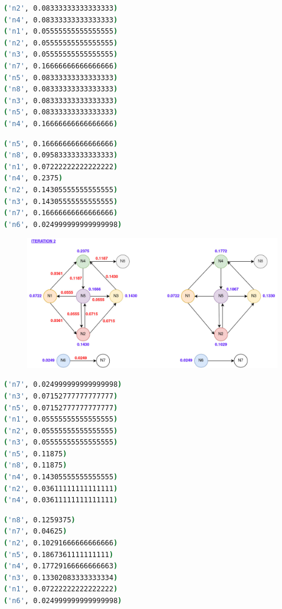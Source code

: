 \documentclass[11pt,a4paper]{article}
\begin{document}
\begin{minipage}{.45\textwidth}
\begin{lstlisting}[language=bash,title={Contributions}]
('n2', 0.08333333333333333)
('n4', 0.08333333333333333)
('n1', 0.05555555555555555)
('n2', 0.05555555555555555)
('n3', 0.05555555555555555)
('n7', 0.16666666666666666)
('n5', 0.08333333333333333)
('n8', 0.08333333333333333)
('n3', 0.08333333333333333)
('n5', 0.08333333333333333)
('n4', 0.16666666666666666)
\end{lstlisting}
\end{minipage}\hfill
\begin{minipage}{.45\textwidth}
\begin{lstlisting}[language=bash,title={New PageRanks}]
('n5', 0.16666666666666666)
('n8', 0.09583333333333333)
('n1', 0.07222222222222222)
('n4', 0.2375)
('n2', 0.14305555555555555)
('n3', 0.14305555555555555)
('n7', 0.16666666666666666)
('n6', 0.024999999999999998)
\end{lstlisting}
\end{minipage}
\begin{figure}[H]
    \centering
    \includegraphics[scale=0.26]{imgs/iteration-2.jpg}
\end{figure}
\begin{minipage}{.45\textwidth}
\begin{lstlisting}[language=bash,title={Contributions}]
('n7', 0.024999999999999998)
('n3', 0.07152777777777777)
('n5', 0.07152777777777777)
('n1', 0.05555555555555555)
('n2', 0.05555555555555555)
('n3', 0.05555555555555555)
('n5', 0.11875)
('n8', 0.11875)
('n4', 0.14305555555555555)
('n2', 0.03611111111111111)
('n4', 0.03611111111111111)
\end{lstlisting}
\end{minipage}\hfill
\begin{minipage}{.45\textwidth}
\begin{lstlisting}[language=bash,title={New PageRanks}]
('n8', 0.1259375)
('n7', 0.04625)
('n2', 0.10291666666666666)
('n5', 0.1867361111111111)
('n4', 0.17729166666666663)
('n3', 0.13302083333333334)
('n1', 0.07222222222222222)
('n6', 0.024999999999999998)
\end{lstlisting}
\end{minipage}
\end{document}
